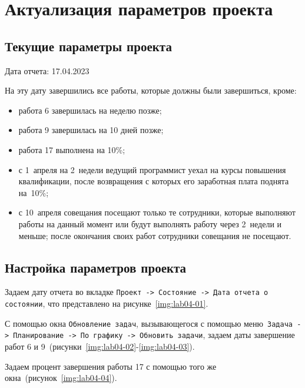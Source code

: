 \clearpage
\section{Актуализация параметров проекта}

\subsection{Текущие параметры проекта}

Дата отчета: 17.04.2023

На эту дату завершились все работы, которые должны были завершиться, кроме:

\begin{itemize}
    \item работа 6 завершилась на неделю позже;
    \item работа 9 завершилась на 10 дней позже;
    \item работа 17 выполнена на 10\%;
    \item с 1~апреля на 2~недели ведущий программист уехал на курсы повышения
	  квалификации, после возвращения с которых его заработная плата
	  поднята на~10\%;
    \item с 10~апреля совещания посещают только те сотрудники, которые
        выполняют работы на данный момент или будут выполнять работу через
        2~недели и меньше; после окончания своих работ сотрудники совещания не
        посещают.
\end{itemize}

\subsection{Настройка параметров проекта}

Задаем дату отчета во вкладке \texttt{Проект -> Состояние -> Дата отчета о
состоянии}, что представлено на рисунке~\ref{img:lab04-01}.


С помощью окна \texttt{Обновление задач}, вызывающегося с помощью
меню~\texttt{Задача -> Планирование -> По графику -> Обновить задачи}, задаем
даты завершение работ 6 и 9~(рисунки~\ref{img:lab04-02}-\ref{img:lab04-03}).



Задаем процент завершения работы 17 с помощью того же
окна~(рисунок~\ref{img:lab04-04}).

